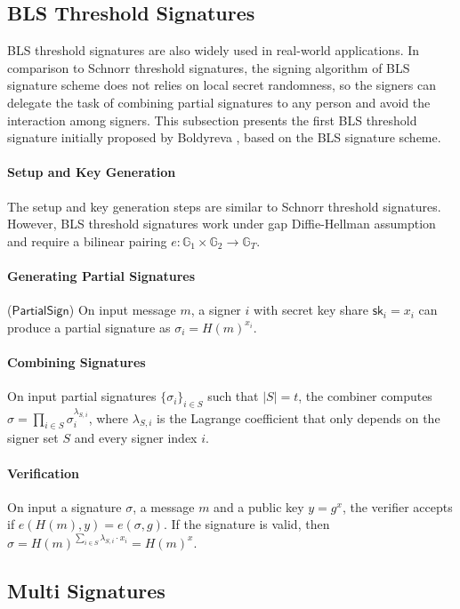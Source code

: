 \subsection{BLS Threshold Signatures}
BLS threshold signatures are also widely used in real-world applications. In comparison to Schnorr threshold signatures, the signing algorithm of BLS signature scheme does not relies on local secret randomness, so the signers can delegate the task of combining partial signatures to any person and avoid the interaction among signers. This subsection presents the first BLS threshold signature initially proposed by Boldyreva \cite{DBLP:conf/pkc/Boldyreva03}, based on the BLS signature scheme. 

\paragraph{Setup and Key Generation} The setup and key generation steps are similar to Schnorr threshold signatures. However, BLS threshold signatures work under gap Diffie-Hellman assumption and require a bilinear pairing $e:\mathbb{G}_1\times \mathbb{G}_2\to \mathbb{G}_T$. 

\paragraph{Generating Partial Signatures} ($\mathsf{PartialSign}$) On input message $m$, a signer $i$ with secret key share $\mathsf{sk}_i = x_i$ can produce a partial signature as $\sigma_i = H(m)^{x_i}$. 

\paragraph{Combining Signatures} On input partial signatures $\{\sigma_i\}_{i\in S}$ such that $|S|=t$, the combiner computes $\sigma = \prod_{i\in S} \sigma_i^{\lambda_{S, i}}$, where $\lambda_{S,i}$ is the Lagrange coefficient that only depends on the signer set $S$ and every signer index $i$. 

\paragraph{Verification} On input a signature $\sigma$, a message $m$ and a public key $y=g^x$, the verifier accepts if $e(H(m), y) = e(\sigma, g)$. If the signature is valid, then $\sigma = H(m)^{\sum_{i\in S} \lambda_{S, i} \cdot x_i} = H(m)^x$. 


\subsection{Multi Signatures}

